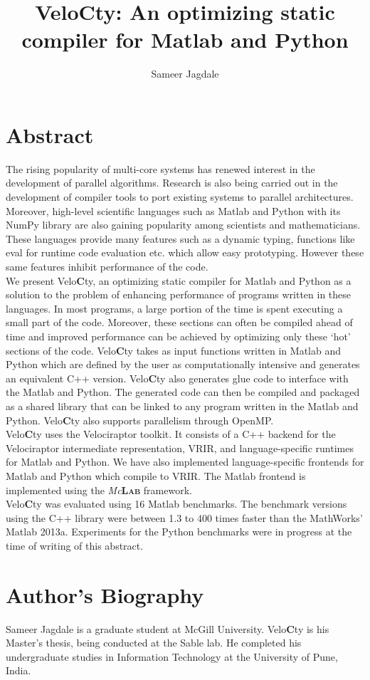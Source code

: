 \documentclass[a4paper, 12pt]{article}
\newcommand{\matlab}{{\textsc Matlab}\xspace}
\newcommand{\velocty}{{Velo\textbf{C}ty}\xspace}
\newcommand{\smclab}{\textrm{\textsl{Mc}\textbf{\textsc{Lab}}}}
\newcommand{\mclab}{\smclab\xspace}
\begin{document}
\title{\velocty : An optimizing static compiler for \matlab and Python}
\author[1]{Sameer Jagdale}
\maketitle
\section*{Abstract}
The rising popularity of multi-core systems has renewed interest in the development of parallel algorithms. Research is also being carried out in the development of compiler tools to port existing systems to parallel architectures. Moreover, high-level scientific languages such as \matlab and Python with its NumPy library are also gaining popularity among scientists and mathematicians. These languages provide many features such as a dynamic typing, functions like eval for runtime code evaluation etc. which allow easy prototyping. However these same features inhibit performance of the code. \\ 
We present \velocty, an optimizing static compiler for \matlab and Python as a solution to the problem of enhancing performance of programs written in these languages. In most programs, a large portion of the time is spent executing a small part of the code. Moreover, these sections can often be compiled ahead of time and improved performance can be achieved by optimizing only these `hot' sections of the code. \velocty takes as input functions written in \matlab and Python which are defined by the user as computationally intensive and generates an equivalent C++ version. \velocty also generates glue code to interface with the \matlab and Python. The generated code can then be compiled and packaged as a shared library that can be linked to any program written in the \matlab and Python. \velocty also supports parallelism through OpenMP.\\
\velocty uses the Velociraptor toolkit. It consists of a C++ backend for the Velociraptor intermediate representation, VRIR, and language-specific runtimes for \matlab and Python. We have also implemented language-specific frontends for \matlab and Python which compile to VRIR. The \matlab frontend is implemented using the \mclab framework. \\
\velocty was evaluated using 16 \matlab benchmarks. The benchmark versions using the C++ library were between 1.3 to 400 times faster than the MathWorks' \matlab2013a. Experiments for the Python benchmarks were in progress at the time of writing of this abstract.
\section*{Author's Biography}
Sameer Jagdale is a graduate student at McGill University. \velocty is his Master's thesis, being conducted at the Sable lab. He completed his undergraduate studies in Information Technology at the University of Pune, India.
\end{document}
